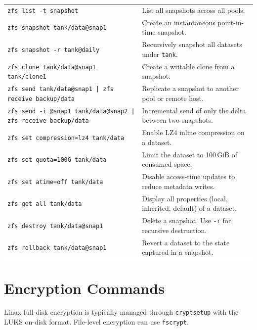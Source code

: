 \begin{longtable}{p{4cm} p{8cm}}
\texttt{zfs list -t snapshot} & List all snapshots across all pools. \\
\texttt{zfs snapshot tank/data@snap1} & Create an instantaneous point-in-time snapshot. \\
\texttt{zfs snapshot -r tank@daily} & Recursively snapshot all datasets under \texttt{tank}. \\
\texttt{zfs clone tank/data@snap1 tank/clone1} & Create a writable clone from a snapshot. \\
\texttt{zfs send tank/data@snap1 | zfs receive backup/data} & Replicate a snapshot to another pool or remote host. \\
\texttt{zfs send -i @snap1 tank/data@snap2 | zfs receive backup/data} & Incremental send of only the delta between two snapshots. \\
\texttt{zfs set compression=lz4 tank/data} & Enable LZ4 inline compression on a dataset. \\
\texttt{zfs set quota=100G tank/data} & Limit the dataset to 100\,GiB of consumed space. \\
\texttt{zfs set atime=off tank/data} & Disable access-time updates to reduce metadata writes. \\
\texttt{zfs get all tank/data} & Display all properties (local, inherited, default) of a dataset. \\
\texttt{zfs destroy tank/data@snap1} & Delete a snapshot. Use \texttt{-r} for recursive destruction. \\
\texttt{zfs rollback tank/data@snap1} & Revert a dataset to the state captured in a snapshot. \\
\bottomrule
\end{longtable}

\section*{Encryption Commands}

Linux full-disk encryption is typically managed through \texttt{cryptsetup}
with the LUKS on-disk format. File-level encryption can use \texttt{fscrypt}.

